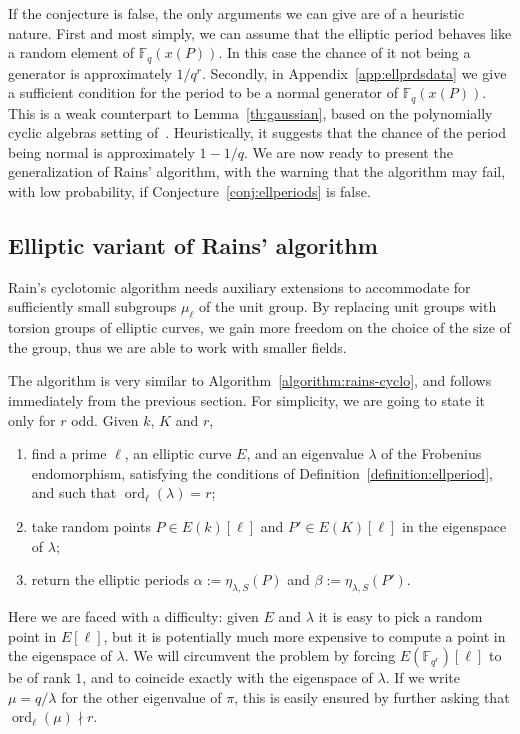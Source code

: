 \documentclass[12pt]{article}
\theoremstyle{plain}
\theoremstyle{definition}
\DeclareMathOperator{\order}{ord} %
\def\F{\ensuremath{\mathbb{F}}}
\newcounter{algorithm}
\begin{document}
If the conjecture is false, the only arguments we can give are of a
heuristic nature. First and most simply, we can assume that the
elliptic period behaves like a random element of $\F_q(x(P))$. In this
case the chance of it not being a generator is approximately
$1/q^r$. %
Secondly, in Appendix~\ref{app:ellprdsdata} we give a sufficient
condition for the period to be a normal generator of
$\F_q(x(P))$. This is a weak counterpart to Lemma~\ref{th:gaussian},
based on the polynomially cyclic algebras setting
of~\cite{Mihailescu2010825}. Heuristically, it suggests that the
chance of the period being normal is approximately $1-1/q$. %
We are now ready to present the generalization of Rains' algorithm,
with the warning that the algorithm may fail, with low probability, if
Conjecture~\ref{conj:ellperiods} is false.



\subsection{Elliptic variant of Rains' algorithm}

Rain's cyclotomic algorithm needs auxiliary extensions to accommodate
for sufficiently small subgroups $\mu_\ell$ of the unit group. By
replacing unit groups with torsion groups of elliptic curves, we gain
more freedom on the choice of the size of the group, thus we are able
to work with smaller fields.  

The algorithm is very similar to
Algorithm~\ref{algorithm:rains-cyclo}, and follows immediately from
the previous section. For simplicity, we are going to state it only
for $r$ odd. Given $k$, $K$ and $r$,
\begin{enumerate}
\item find a prime $\ell$, an elliptic curve $E$, and an eigenvalue
  $\lambda$ of the Frobenius endomorphism, satisfying the conditions
  of Definition~\ref{definition:ellperiod}, and such that
  $\order_\ell(\lambda)=r$;
\item take random points $P\in E(k)[\ell]$ and $P'\in E(K)[\ell]$ in
  the eigenspace of $\lambda$;
\item return the elliptic periods $\alpha := \eta_{\lambda,S}(P)$ and
  $\beta:= \eta_{\lambda,S}(P')$.
\end{enumerate}

Here we are faced with a difficulty: given $E$ and $\lambda$ it is
easy to pick a random point in $E[\ell]$, but it is potentially much
more expensive to compute a point in the eigenspace of $\lambda$. We
will circumvent the problem by forcing $E(\F_{q^r})[\ell]$ to be of
rank $1$, and to coincide exactly with the eigenspace of $\lambda$.
If we write $\mu = q/\lambda$ for the other eigenvalue of $\pi$, this
is easily ensured by further asking that $\order_\ell(\mu) \nmid r$.
\end{document}
